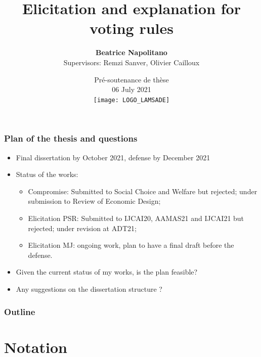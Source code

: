 \documentclass{beamer}
\title[Elicitation and explanation for voting rules]{Elicitation and explanation for voting rules}
\author[Beatrice Napolitano]{\textbf{Beatrice Napolitano} \\
	Supervisors: Remzi Sanver, Olivier Cailloux}
\date[06 July 2021]{ Pré-soutenance de thèse \\ 06 July 2021 \\ \texttt{[image: LOGO\_LAMSADE]} }
\begin{document}
\beamertemplatenavigationsymbolsempty

\begin{frame}[plain]
\maketitle
\end{frame}

\addtocounter{framenumber}{-1}

\begin{frame}
	\frametitle{Plan of the thesis and questions}
		\begin{itemize}
			\item Final dissertation by October 2021, defense by December 2021
			\item Status of the works:
			\begin{itemize}
				\item Compromise: Submitted to Social Choice and Welfare but rejected; under submission to Review of Economic Design;
				\item Elicitation PSR: Submitted to IJCAI20, AAMAS21 and IJCAI21 but rejected; under revision at ADT21;
				\item Elicitation MJ: ongoing work, plan to have a final draft before the defense.
			\end{itemize}
			\item Given the current status of my works, is the plan feasible?
			\item Any suggestions on the dissertation structure ?
		\end{itemize}
\end{frame}


\begin{frame}
	\frametitle{Outline}
	\tableofcontents[hideallsubsections, sectionstyle=shaded/show]
\end{frame}


\section{Notation}
\end{document}
